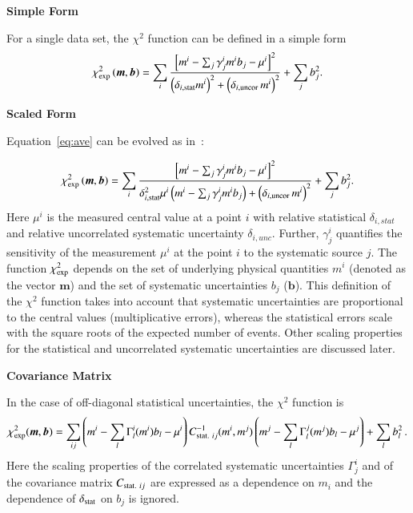 \begin{description}
\item \bf{Simple Form} \rm

For a single data set, the $\chi^2$ function can be defined in a simple form 
\begin{equation}
 \chi^2_{\rm exp}\left(\boldsymbol{m},\boldsymbol{b}\right) = %
 \sum_i
 \frac{\left[m^i
- \sum_j \gamma^i_j m^i b_j  - {\mu^i} \right]^2}
{ \textstyle \left(\delta_{i,{\rm stat}}m^i\right)^2 +
\left(\delta_{i,{\rm uncor}}\,  m^i\right)^2}
 + \sum_j b^2_j.
\label{eq:ave}\end{equation}
%

\item \bf{Scaled Form} \rm

Equation~\ref{eq:ave} can be evolved as in~\cite{H1:2009bp}:

%
\begin{equation}
 \chi^2_{\rm exp}\left(\boldsymbol{m},\boldsymbol{b}\right) = %
 \sum_i
 \frac{\left[m^i
- \sum_j \gamma^i_j m^i b_j  - {\mu^i} \right]^2}
{ \textstyle \delta^2_{i,{\rm stat}}\mu^i \left(m^i -  \sum_j \gamma^i_j m^i b_j\right)+
\left(\delta_{i,{\rm uncor}}\,  m^i\right)^2}
 + \sum_j b^2_j.
\label{eq:aven}\end{equation}
%
Here ${\mu^i}$ is the  measured central value  at a point $i$ 
with  relative statistical $\delta_{i,stat}$ 
and relative uncorrelated systematic uncertainty $\delta_{i,unc}$.
Further, 
$\gamma^i_j$ 
quantifies the sensitivity of the
measurement ${\mu^i}$ at the point $i$ to the systematic source $j$. 
The function $\chi^2_{\rm exp}$ depends on the set of
underlying physical quantities $m^i$ 
(denoted as the vector $\boldsymbol{m}$) and 
 the set of systematic uncertainties $b_j$ ($\boldsymbol{b}$).
This definition of the $\chi^2$ function takes into account that
systematic uncertainties are proportional to the central values 
(multiplicative errors), whereas the statistical errors scale 
with the square roots of the expected number of events. 
Other scaling properties for the statistical and uncorrelated
systematic uncertainties 
are discussed later.

\item \bf{Covariance Matrix} \rm

In the case of off-diagonal statistical uncertainties, the $\chi^2$ function
is
\begin{equation} \label{eq:chi2gen}
\chi^2_{\rm exp} (\boldsymbol{m},\boldsymbol{b}) = \sum_{ij} \left ( m^i - \sum_l \Gamma^i_l(m^i)b_l - \mu^i \right)
  C^{-1}_{{\rm stat.}~ij}(m^i,m^j) \left(  m^j - \sum_l \Gamma^j_l(m^j)b_l - \mu^j \right) + 
\sum_l b^2_l \,.
\end{equation}
Here the scaling properties of the correlated systematic uncertainties 
$\Gamma^i_j$ and
of the covariance matrix $C_{{\rm stat.}~ij}$ are expressed as a dependence
on $m_i$ and the dependence of $\delta_{\rm stat}$ on $b_j$ is ignored.


\end{description}
